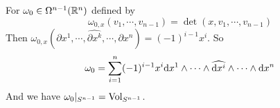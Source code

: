 \begin{example}
    For  $ \omega_0\in\Omega^{n-1}(\mathbb R^n ) $ defined by 
    \[\omega_{0,x}(v_1,\cdots,v_{n-1})=\det(x,v_1,\cdots,v_{n-1})\]
    Then   $ \omega_{0,x}(\partial x^1,\cdots,\hat{\partial x^k},\cdots,\partial x^n)=(-1)^{i-1}x^i $. 
    So 
    \[\omega_0=\displaystyle\sum_{i=1}^n(-1)^{i-1}x^i\mathrm{d} x^1\wedge\cdots\wedge\widehat{\mathrm{d} x^i}\wedge\cdots\wedge\mathrm{d} x^n\]
    And we have  $ \omega_0|_{S^{n-1}}=\mathrm{Vol}_{S^{n-1}} $. 
\end{example}